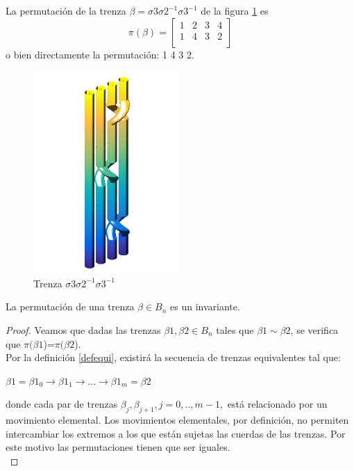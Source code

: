 La permutación de la trenza $\beta = \sigma3\sigma2^{-1}\sigma3^{-1}$ de la figura \ref{perm1} es \[\pi(\beta)=\begin{bmatrix}
1 & 2 & 3 & 4\\
1 & 4 & 3 & 2 \\
\end{bmatrix}\] o bien directamente la permutación: 1 4 3 2.\\
\begin{figure}[h!]
	\centering
	\includegraphics[width=5.5cm]{itrenzas/4c3.png}
	\caption{Trenza $\sigma3\sigma2^{-1}\sigma3^{-1}$}
	\label{perm1} 
\end{figure}

\begin{pro}
    La permutación de una trenza $\beta \in B_{n}$ es un invariante. 
    \begin{proof}
    	Veamos que dadas las trenzas $\beta1,\beta2 \in B_{n}$ tales que $\beta1 \sim \beta2$, se verifica que $\pi(\beta1$)=$\pi(\beta2$).\\
    	
    	Por la definición \ref{defequi}, existirá la secuencia de trenzas equivalentes tal que: 
    	\begin{center}
    		$ \beta1 = \beta1_{0} \rightarrow \beta1_{1} \rightarrow ... \rightarrow \beta1_{m}=\beta2$ 
    	\end{center}
    	donde cada par de trenzas $ \beta_{j}, \beta_{j+1}, j=0,..,m-1, $ está relacionado por un movimiento elemental. Los movimientos elementales, por definición, no permiten intercambiar los extremos a los que están sujetas las cuerdas de las trenzas. Por este motivo las permutaciones tienen que ser iguales. \\
    \end{proof}
\end{pro}

